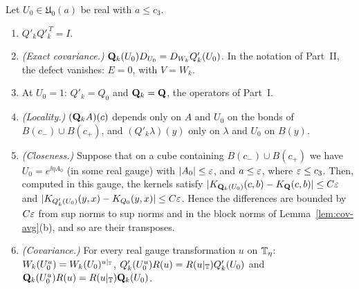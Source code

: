 \begin{proposition}\label{prop:linearized-averages}
Let $U_0\in\mathfrak U_0(a)$ be real with $a\le c_3$.
\begin{enumerate}[label=(\alph*)]
\item $Q'_kQ'^{\,T}_k=I$.
\item \emph{(Exact covariance.)} $\mathbf Q_k(U_0)D_{U_0}=D_{W_k}Q'_k(U_0)$. In the notation of Part~II, the defect vanishes: $E=0$, with $V=W_k$.
\item At $U_0=1$: $Q'_k=Q_0$ and $\mathbf Q_k=\mathbf Q$, the operators of Part~I.
\item \emph{(Locality.)} $(\mathbf Q_kA)(c)$ depends only on $A$ and $U_0$ on the bonds of $B(c_-)\cup B(c_+)$, and $(Q'_k\lambda)(y)$ only on $\lambda$ and $U_0$ on $B(y)$.
\item \emph{(Closeness.)} Suppose that on a cube containing $B(c_-)\cup B(c_+)$ we have $U_0=e^{\ii\eta A_0}$ (in some real gauge) with $|A_0|\le\varepsilon$, and $a\le\varepsilon$, where $\varepsilon\le c_3$. Then, computed in this gauge, the kernels satisfy $|K_{\mathbf Q_k(U_0)}(c,b)-K_{\mathbf Q}(c,b)|\le C\varepsilon$ and $|K_{Q'_k(U_0)}(y,x)-K_{Q_0}(y,x)|\le C\varepsilon$. Hence the differences are bounded by $C\varepsilon$ from sup norms to sup norms and in the block norms of Lemma~\ref{lem:cov-avg}(b), and so are their transposes.
\item \emph{(Covariance.)} For every real gauge transformation $u$ on $\mathbb T_\eta$: $W_k(U_0^u)=W_k(U_0)^{u|_\mathbb T}$, $Q'_k(U_0^u)R(u)=R(u|_\mathbb T)Q'_k(U_0)$ and $\mathbf Q_k(U_0^u)R(u)=R(u|_\mathbb T)\mathbf Q_k(U_0)$.
\end{enumerate}
\end{proposition}

